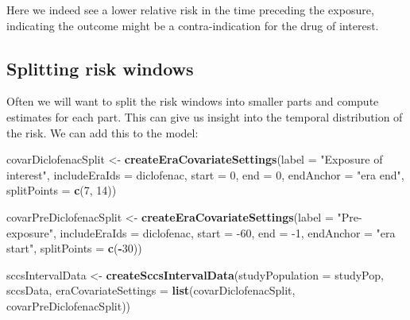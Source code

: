 \documentclass[
]{article}
\newenvironment{Shaded}{\begin{snugshade}}{\end{snugshade}}
\newcommand{\DataTypeTok}[1]{\textcolor[rgb]{0.13,0.29,0.53}{#1}}
\newcommand{\DecValTok}[1]{\textcolor[rgb]{0.00,0.00,0.81}{#1}}
\newcommand{\KeywordTok}[1]{\textcolor[rgb]{0.13,0.29,0.53}{\textbf{#1}}}
\newcommand{\NormalTok}[1]{#1}
\newcommand{\OperatorTok}[1]{\textcolor[rgb]{0.81,0.36,0.00}{\textbf{#1}}}
\newcommand{\StringTok}[1]{\textcolor[rgb]{0.31,0.60,0.02}{#1}}
\begin{document}
Here we indeed see a lower relative risk in the time preceding the
exposure, indicating the outcome might be a contra-indication for the
drug of interest.

\hypertarget{splitting-risk-windows}{%
\subsection{Splitting risk windows}\label{splitting-risk-windows}}

Often we will want to split the risk windows into smaller parts and
compute estimates for each part. This can give us insight into the
temporal distribution of the risk. We can add this to the model:

\begin{Shaded}
\begin{Highlighting}[]
\NormalTok{covarDiclofenacSplit <-}\StringTok{ }\KeywordTok{createEraCovariateSettings}\NormalTok{(}\DataTypeTok{label =} \StringTok{"Exposure of interest"}\NormalTok{,}
                                                   \DataTypeTok{includeEraIds =}\NormalTok{ diclofenac,}
                                                   \DataTypeTok{start =} \DecValTok{0}\NormalTok{,}
                                                   \DataTypeTok{end =} \DecValTok{0}\NormalTok{,}
                                                   \DataTypeTok{endAnchor =} \StringTok{"era end"}\NormalTok{,}
                                                   \DataTypeTok{splitPoints =} \KeywordTok{c}\NormalTok{(}\DecValTok{7}\NormalTok{, }\DecValTok{14}\NormalTok{))}

\NormalTok{covarPreDiclofenacSplit <-}\StringTok{ }\KeywordTok{createEraCovariateSettings}\NormalTok{(}\DataTypeTok{label =} \StringTok{"Pre-exposure"}\NormalTok{,}
                                                      \DataTypeTok{includeEraIds =}\NormalTok{ diclofenac,}
                                                      \DataTypeTok{start =} \DecValTok{-60}\NormalTok{,}
                                                      \DataTypeTok{end =} \DecValTok{-1}\NormalTok{,}
                                                      \DataTypeTok{endAnchor =} \StringTok{"era start"}\NormalTok{,}
                                                      \DataTypeTok{splitPoints =} \KeywordTok{c}\NormalTok{(}\OperatorTok{-}\DecValTok{30}\NormalTok{))}

\NormalTok{sccsIntervalData <-}\StringTok{ }\KeywordTok{createSccsIntervalData}\NormalTok{(}\DataTypeTok{studyPopulation =}\NormalTok{ studyPop,}
\NormalTok{                                           sccsData,}
                                           \DataTypeTok{eraCovariateSettings =} \KeywordTok{list}\NormalTok{(covarDiclofenacSplit,}
\NormalTok{                                                                       covarPreDiclofenacSplit))}
\end{Highlighting}
\end{Shaded}
\end{document}
